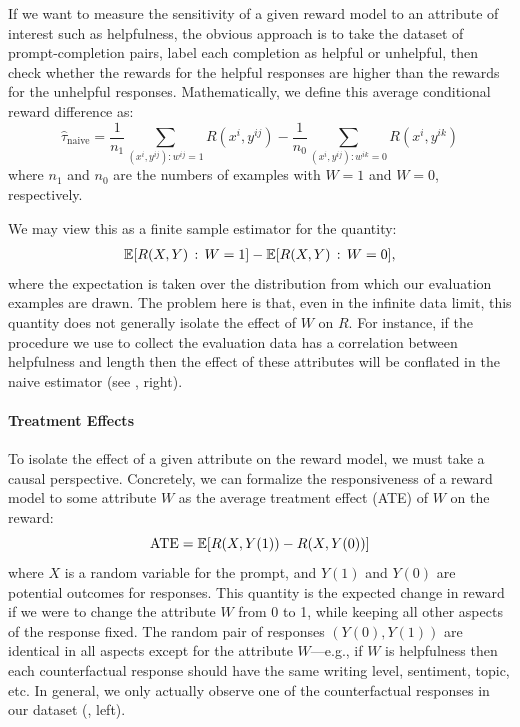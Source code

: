 \documentclass{article}
\begin{document}
If we want to measure the sensitivity of a given reward model to an attribute of interest such as helpfulness, the obvious approach is to take the dataset of prompt-completion pairs, label each completion as helpful or unhelpful, then check whether the rewards for the helpful responses are higher than the rewards for the unhelpful responses. 
Mathematically, we define this average conditional reward difference as:
  \[\hat{\tau}_{\text{naive}} = \frac{1}{n_1} \sum_{(x^i, y^{ij}): w^{ij} = 1} R(x^i, y^{ij}) - \frac{1}{n_0} \sum_{(x^i, y^{ij}):w^{ik}=0} R(x^i, y^{ik})\]
where $n_1$ and $n_0$ are the numbers of examples with $W = 1$ and $W = 0$, respectively.

We may view this as a finite sample estimator for the quantity:
\begin{align*}
    \EE[R(X, Y) \given W=1] - \EE[R(X, Y) \given W=0],
\end{align*}
where the expectation is taken over the distribution from which our evaluation examples are drawn. 
The problem here is that, even in the infinite data limit, this quantity does not generally isolate the effect of $W$ on $R$. For instance, if the procedure we use to collect the evaluation data has a correlation between helpfulness and length then the effect of these attributes will be conflated in the naive estimator (see , right).

\paragraph{Treatment Effects}
To isolate the effect of a given attribute on the reward model, we must take a causal perspective.
Concretely, we can formalize the responsiveness of a reward model to some attribute $W$ as the average treatment effect (ATE) of $W$ on the reward:
\begin{equation*}
    \text{ATE} = \mathbb{E}[R(X, Y(1)) - R(X, Y(0))]
\end{equation*}
where $X$ is a random variable for the prompt, and $Y(1)$ and $Y(0)$ are potential outcomes for responses.
This quantity is the expected change in reward if we were to change the attribute $W$ from 0 to 1, while keeping all other aspects of the response fixed. 
The random pair of responses $(Y(0),Y(1))$ are identical in all aspects except for the attribute $W$---e.g., if $W$ is helpfulness then each counterfactual response should have the same writing level, sentiment, topic, etc.
In general, we only actually observe one of the counterfactual responses in our dataset (, left). 
\end{document}
